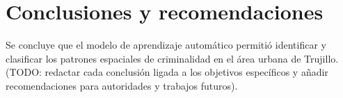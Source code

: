 
\section{Conclusiones y recomendaciones}

\label{sec:conclusiones}

Se concluye que el modelo de aprendizaje automático permitió identificar
y clasificar los patrones espaciales de criminalidad en el área urbana
de Trujillo. (TODO: redactar cada conclusión ligada a los objetivos
específicos y añadir recomendaciones para autoridades y trabajos futuros).
